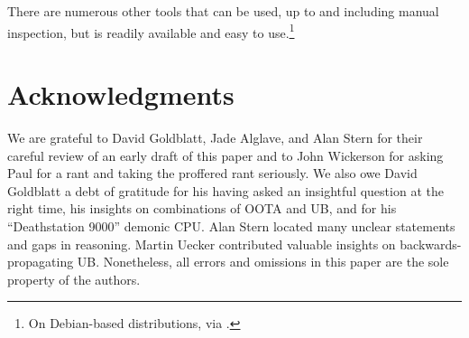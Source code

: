 \documentclass[10]{article}
\begin{document}
There are numerous other tools that can be used, up to and including
manual inspection, but  is readily available and easy to
use.\footnote{
	On Debian-based distributions, via .}


\section{Acknowledgments}
\label{sec:Acknowledgments}

We are grateful to David Goldblatt, Jade Alglave, and Alan Stern for their
careful review of an early draft of this paper and to John Wickerson for
asking Paul for a rant and taking the proffered rant seriously.
We also owe David Goldblatt a debt of gratitude for his having asked an
insightful question at the right time, his insights on combinations of
OOTA and UB, and for his ``Deathstation 9000'' demonic CPU.
Alan Stern located many unclear statements and gaps in reasoning.
Martin Uecker contributed valuable insights on backwards-propagating UB.
Nonetheless, all errors and omissions in this paper are the sole property
of the authors.


\end{document}
